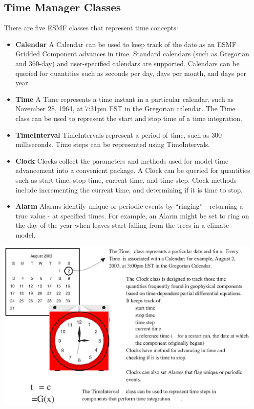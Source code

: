 \subsection{Time Manager Classes}
There are five ESMF classes that represent time concepts:
\begin{itemize}
\item {\bf Calendar}  A Calendar can be used to keep track of the 
date as an ESMF Gridded Component advances in time. Standard calendars 
(such as Gregorian and 360-day) and user-specified calendars are 
supported.  Calendars can be queried for quantities such as seconds 
per day, days per month, and days per year.  
\item {\bf Time} A Time represents a time instant in a particular
calendar, such as November 28, 1964, at 7:31pm EST in the Gregorian 
calendar.  The Time class can be used 
to represent the start and stop time of a time integration.
\item {\bf TimeInterval} TimeIntervals represent a period 
of time, such as 300 milliseconds.  Time steps can be represented 
using TimeIntervals.  
\item {\bf Clock} Clocks collect the parameters and 
methods used for model time advancement into a convenient 
package.  A Clock can be queried for quantities such
as start time, stop time, current time, and time step.  Clock
methods include incrementing the current time, and determining
if it is time to stop.  
\item {\bf Alarm} Alarms identify unique or periodic events
by ``ringing'' - returning a true value - at specified times.  
For example, an Alarm might be set to ring on the day of the 
year when leaves start falling from the trees in a climate model.
\end{itemize}

\begin{center}
\includegraphics{TimeMgr_desc.eps}
\end{center}

